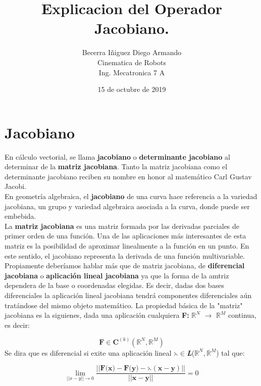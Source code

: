 \documentclass[letter,openrigh,12pt,spanish]{report}
\title{\textbf{Explicacion del Operador Jacobiano.}}
\author{Becerra I\~niguez Diego Armando\\
		Cinematica de Robots\\
		Ing. Mecatronica 7 A}
\date{15 de octubre de 2019}
\begin{document}
\maketitle

\section{Jacobiano}
En c\'alculo vectorial, se llama \textbf{jacobiano} o \textbf{determinante jacobiano} al determinar de la \textbf{matriz jacobiana}. Tanto la matriz jacobiana como el determinante jacobiano reciben su nombre en honor al matem\'atico Carl Gustav Jacobi.\\
En geometr\'ia algebraica, el \textbf{jacobiano} de una curva hace referencia a la variedad jacobiana, un grupo y variedad algebraica asociada a la curva, donde puede ser embebida.\\
La \textbf{matriz jacobiana} es una matriz formada por las derivadas parciales de primer orden de una funci\'on. Una de las aplicaciones m\'as interesantes de esta matriz es la posibilidad de aproximar linealmente a la funci\'on en un punto. En este sentido, el jacobiano representa la derivada de una funci\'on multivariable.\\
Propiamente deber\'iamos hablar m\'as que de matriz jacobiana, de \textbf{diferencial jacobiana} o \textbf{aplicaci\'on lineal jacobiana} ya que la forma de la amtriz dependera de la base o coordenadas elegidas. Es decir, dadas dos bases diferenciales la aplicaci\'on lineal jacobiana tendr\'a componentes diferenciales a\'un trat\'andose del mismo objeto matem\'atico. La propiedad b\'asica de la "matriz" jacobiana es la siguienes, dada una aplicaci\'on cualquiera \textbf{F:} $\mathbb{R}^N$ $\longrightarrow$ $\mathbb{R}^M$ continua, es decir:

\begin{displaymath}
\textbf{F}\in\textbf{C}^{(k)}(\mathbb{R}^N,\mathbb{R}^M)
\end{displaymath}
Se dira que es diferencial si exite una aplicaci\'on lineal \textbf{$\leftthreetimes$}$\in$\textbf{\textit{L}}($\mathbb{R}^N,\mathbb{R}^M$) tal que:

\begin{center}
\begin{displaymath}
\lim\limits_{||x-y|| \rightarrow 0} \frac{||\textbf{F(x)}-\textbf{F(y)}-\leftthreetimes(\textbf{x}-\textbf{y})||}{||\textbf{x}-\textbf{y}||}=0
\end{displaymath}
\end{center}
\end{document}

